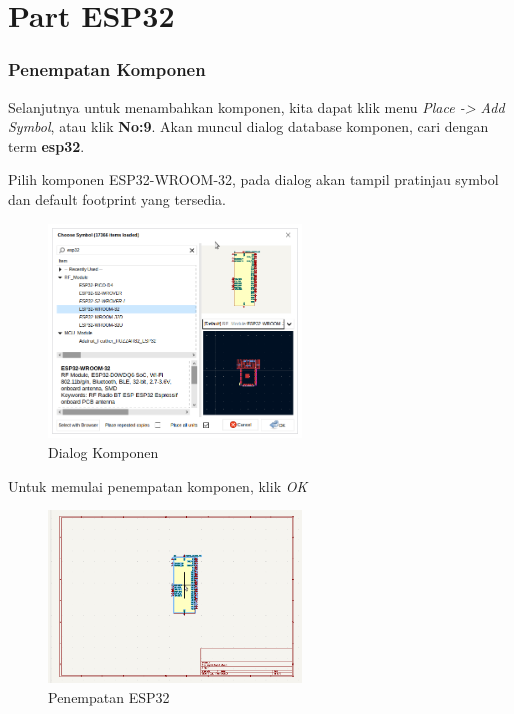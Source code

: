 \documentclass[12pt]{book}
\begin{document}
	\newpage
	\section{Part ESP32}

	\subsubsection{Penempatan Komponen}

	Selanjutnya untuk menambahkan komponen, kita dapat klik menu \textit{Place -> Add Symbol}, atau klik \textbf{No:9}.
	Akan muncul dialog database komponen, cari dengan term \textbf{esp32}.

	Pilih komponen ESP32-WROOM-32, pada dialog akan tampil pratinjau symbol dan default footprint yang tersedia.
	\begin{figure}[!ht]
		\centering
		\includegraphics[width=0.6\textwidth]{images/sch/sch_2}
		\caption{Dialog Komponen}
	\end{figure}

	Untuk memulai penempatan komponen, klik \textit{OK}

	\begin{figure}[!ht]
		\centering
		\includegraphics[width=0.6\textwidth]{images/sch/sch_3}
		\caption{Penempatan ESP32}
	\end{figure}
\end{document}
